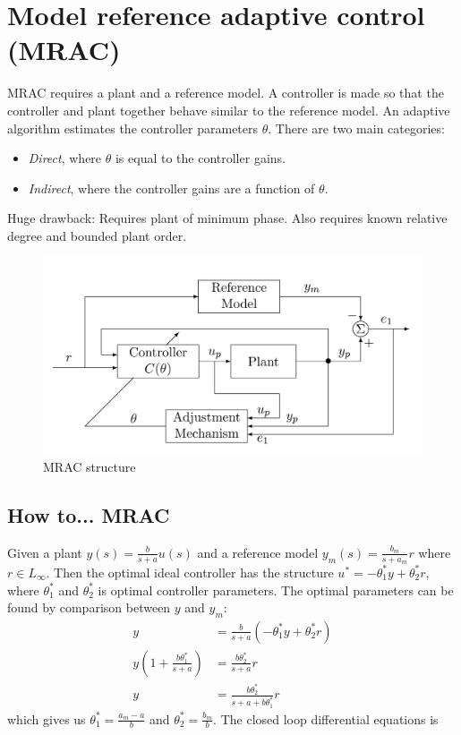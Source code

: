 \section{Model reference adaptive control (MRAC)}
MRAC requires a plant and a reference model. A controller is made so that the controller and plant together behave similar to the reference model. An adaptive algorithm estimates the controller parameters $\theta$. There are two main categories:
\begin{itemize}
	\item \emph{Direct}, where $\theta$ is equal to the controller gains.
	\item \emph{Indirect}, where the controller gains are a function of $\theta$.
\end{itemize}
Huge drawback: Requires plant of minimum phase. Also requires known relative degree and bounded plant order.

\begin{figure}[htbp]
\begin{center}
\includegraphics[width = \textwidth]{MRAC}
\caption{MRAC structure}
\end{center}
\end{figure}

\subsection{How to... MRAC}
Given a plant $y(s) = \frac{b}{s+a}u(s)$ and a reference model $y_m(s) = \frac{b_m}{s+a_m}r$ where $r \in L_\infty$.
Then the optimal ideal controller has the structure $u^* = -\theta_1^* y + \theta_2^* r$, where $\theta_1^*$ and $\theta_2^*$ is optimal controller parameters. The optimal parameters can be found by comparison between $y$ and $y_m$:
\begin{equation}
\begin{split}
y &= \frac{b}{s+a}(-\theta_1^* y + \theta_2^* r) \\
y(1+\frac{b\theta_1^*}{s+a} ) &= \frac{b\theta_2^*}{s+a}r \\
y &= \frac{b\theta_2^*}{s+a+b\theta_1^*}r
\end{split}
\end{equation}
which gives us $\theta_1^* = \frac{a_m-a}{b}$ and $\theta_2^* = \frac{b_m}{b}$. The closed loop differential equations is

